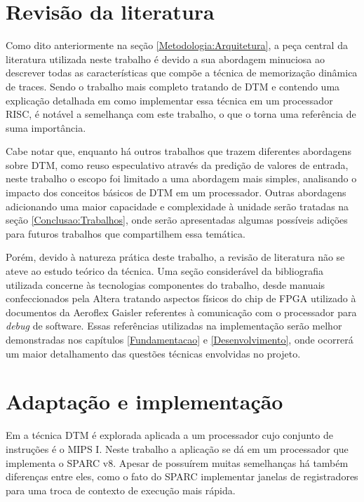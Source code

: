 \section{Revisão da literatura}
\label{Metodologia:Literatura}

Como dito anteriormente na seção \ref{Metodologia:Arquitetura}, a peça central da literatura utilizada neste trabalho é  devido a sua abordagem minuciosa ao descrever todas as características que compõe a técnica de memorização dinâmica de traces. Sendo o trabalho mais completo tratando de DTM e contendo uma explicação detalhada em como implementar essa técnica em um processador RISC, é notável a semelhança com este trabalho, o que o torna uma referência de suma importância.

Cabe notar que, enquanto há outros trabalhos que trazem diferentes abordagens sobre DTM, como reuso especulativo através da predição de valores de entrada, neste trabalho o escopo foi limitado a uma abordagem mais simples, analisando o impacto dos conceitos básicos de DTM em um processador. Outras abordagens adicionando uma maior capacidade e complexidade à unidade serão tratadas na seção \ref{Conclusao:Trabalhos}, onde serão apresentadas algumas possíveis adições para futuros trabalhos que compartilhem essa temática.



Porém, devido à natureza prática deste trabalho, a revisão de literatura não se ateve ao estudo teórico da técnica. Uma seção considerável da bibliografia utilizada concerne às tecnologias componentes do trabalho, desde manuais confeccionados pela Altera tratando aspectos físicos do chip de FPGA utilizado à documentos da Aeroflex Gaisler referentes à comunicação com o processador para \textit{debug} de software. Essas referências utilizadas na implementação serão melhor demonstradas nos capítulos \ref{Fundamentacao} e \ref{Desenvolvimento}, onde ocorrerá um maior detalhamento das questões técnicas envolvidas no projeto.


\section{Adaptação e implementação}
\label{Metodologia:Implementacao}

Em  a técnica DTM é explorada aplicada a um processador cujo conjunto de instruções é o MIPS I. Neste trabalho a aplicação se dá em um processador que implementa o SPARC v8. Apesar de possuírem muitas semelhanças há também diferenças entre eles, como o fato do SPARC implementar janelas de registradores para uma troca de contexto de execução mais rápida.

